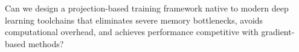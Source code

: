 
\vspace{0.5em}
\begin{tcolorbox}[researchcard]
Can we design a projection-based training framework native to modern deep learning toolchains that eliminates severe memory bottlenecks, avoids computational overhead, and achieves performance competitive with gradient-based methods?
\end{tcolorbox}
\vspace{0.5em}




